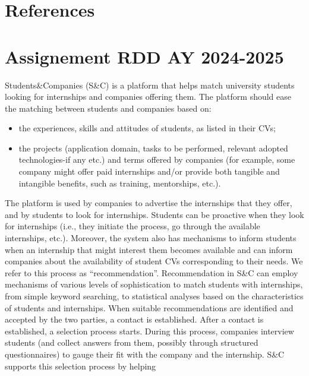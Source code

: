 \documentclass [11pt,twoside]{article}
\begin{document}
    \section{References} %
    \printbibliography[heading=none]

    \clearpage
    \appendix
    \section{Assignement RDD AY 2024-2025}
    \label{appendix:assignement}
    Students\&Companies (S\&C) is a platform that helps match university students looking for internships
    and companies offering them. The platform should ease the matching between students and
    companies based on:
    \begin{itemize}
        \item the experiences, skills and attitudes of students, as listed in their CVs;
        \item the projects (application domain, tasks to be performed, relevant adopted technologies-if any etc.) and terms offered by companies (for example, some company might offer paid internships and/or provide both tangible and intangible benefits, such as training, mentorships, etc.).
    \end{itemize}
The platform is used by companies to advertise the internships that they offer, and by students to look
for internships. Students can be proactive when they look for internships (i.e., they initiate the process,
go through the available internships, etc.). Moreover, the system also has mechanisms to inform
students when an internship that might interest them becomes available and can inform companies
about the availability of student CVs corresponding to their needs. We refer to this process as
“recommendation”.
Recommendation in S\&C can employ mechanisms of various levels of sophistication to match students
with internships, from simple keyword searching, to statistical analyses based on the characteristics of
students and internships.
When suitable recommendations are identified and accepted by the two parties, a contact is
established. After a contact is established, a selection process starts. During this process, companies
interview students (and collect answers from them, possibly through structured questionnaires) to
gauge their fit with the company and the internship. S\&C supports this selection process by helping
\end{document}
